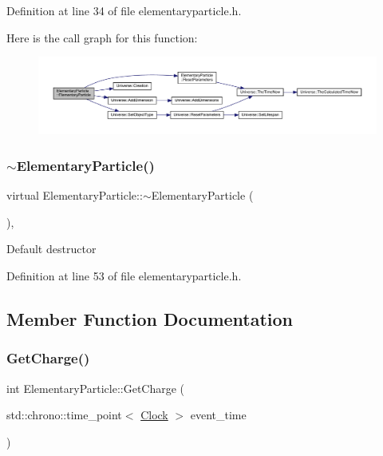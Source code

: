 Definition at line 34 of file elementaryparticle.\+h.

Here is the call graph for this function\+:
\nopagebreak
\begin{figure}[H]
\begin{center}
\leavevmode
\includegraphics[width=350pt]{class_elementary_particle_a0b43033247b36096d0de2a7553c620a9_cgraph}
\end{center}
\end{figure}
\mbox{\label{class_elementary_particle_a5adce47bf88a5381c88a4d40f87fe76f}} 
\subsubsection{\texorpdfstring{$\sim$\+Elementary\+Particle()}{~ElementaryParticle()}}
{\footnotesize\ttfamily virtual Elementary\+Particle\+::$\sim$\+Elementary\+Particle (\begin{DoxyParamCaption}{ }\end{DoxyParamCaption})\hspace{0.3cm}{\ttfamily [inline]}, {\ttfamily [virtual]}}

Default destructor 

Definition at line 53 of file elementaryparticle.\+h.



\subsection{Member Function Documentation}
\mbox{\label{class_elementary_particle_af3ebb984cfe957b2e76463c22e4b5bb5}} 
\subsubsection{\texorpdfstring{Get\+Charge()}{GetCharge()}}
{\footnotesize\ttfamily int Elementary\+Particle\+::\+Get\+Charge (\begin{DoxyParamCaption}\item[{std\+::chrono\+::time\+\_\+point$<$ \hyperlink{universe_8h_a0ef8d951d1ca5ab3cfaf7ab4c7a6fd80}{Clock} $>$}]{event\+\_\+time }\end{DoxyParamCaption})\hspace{0.3cm}{\ttfamily [inline]}}



